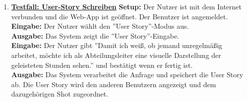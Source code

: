 \begin{enumerate}
	\item \underline{\textbf{Testfall: User-Story Schreiben}} \linebreak
	\textbf{Setup:} Der Nutzer ist mit dem Internet verbunden und die Web-App ist geöffnet. Der Benutzer ist angemeldet.\\
	\textbf{Eingabe:} Der Nutzer wählt den ''User Story''-Modus aus. \\
	\textbf{Ausgabe:} Das System zeigt die ''User Story''-Eingabe. \\
	\textbf{Eingabe:} Der Nutzer gibt ''Damit ich weiß, ob jemand unregelmäßig arbeitet,
möchte ich als Abteilungsleiter eine visuelle Darstellung der geleisteten Stunden sehen.'' und bestätigt wenn er fertig ist.\\
	\textbf{Ausgabe:} Das System verarbeitet die Anfrage und speichert die User Story ab. Die User Story wird den anderen Benutzern angezeigt und dem dazugehörigen Shot zugeordnet. \\
	
	

\end{enumerate}

